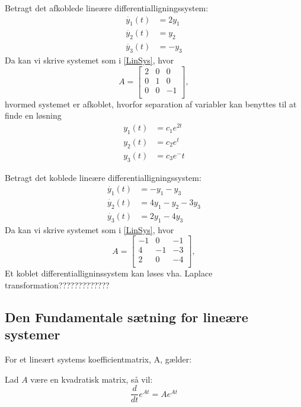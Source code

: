\begin{Example}
\textnormal{ \hfill \break
Betragt det afkoblede lineære differentialligningssystem:}
\hfill \break
\begin{align*}
    \dot{y_1}(t) &= 2y_1\\
    \dot{y_2}(t) &= y_2\\
    \dot{y_3}(t) &= -y_3
\end{align*}
\textnormal{Da kan vi skrive systemet som i \ref{LinSys}, hvor}
\hfill \break
\[ A =
\begin{bmatrix}
2 & 0 & 0\\
0 & 1 & 0\\
0 & 0 & -1\\
\end{bmatrix},
\]
\textnormal{hvormed systemet er afkoblet, hvorfor separation af variabler kan benyttes til at finde en løsning}
\begin{align*}
    y_1(t) &= c_1e^{2t}\\
    y_2(t) &= c_2e^t\\
    y_3(t) &= c_3e^-t
\end{align*}

\end{Example}

\begin{Example}\textnormal{
\hfill \break
Betragt det koblede lineære differentialligningssystem:}
\begin{align*}
    \dot{y_1}(t) &= -y_1-y_3\\
    \dot{y_2}(t) &= 4y_1-y_2-3y_3\\
    \dot{y_3}(t) &= 2y_1-4y_3
\end{align*}
\textnormal{Da kan vi skrive systemet som i \ref{LinSys}, hvor}
\hfill \break
\[ A =
\begin{bmatrix}
-1 & 0 & -1\\
4 & -1 & -3\\
2 & 0 & -4\\
\end{bmatrix},
\]
\textnormal{Et koblet differentialligninssystem kan løses vha. Laplace transformation?????????????} 
\end{Example}

\subsection{Den Fundamentale sætning for lineære systemer}

For et lineært systems koefficientmatrix, A, gælder:
\begin{lemma}{}{}
Lad $A$ være en kvadratisk matrix, så vil:
$$\frac{d}{dt}e^{At} = Ae^{At}$$
\end{lemma}

